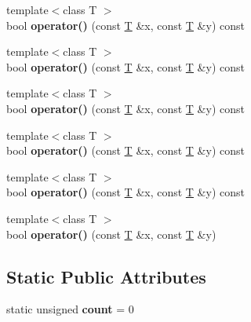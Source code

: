 \begin{DoxyCompactItemize}
{\footnotesize template$<$class T $>$ }\\bool {\bfseries operator()} (const \mbox{\hyperlink{struct_t}{T}} \&x, const \mbox{\hyperlink{struct_t}{T}} \&y) const
\item 
\mbox{\label{structcount__equal_af3e22fbfee92a5e2854cd3fee9dbf7ef}} 
{\footnotesize template$<$class T $>$ }\\bool {\bfseries operator()} (const \mbox{\hyperlink{struct_t}{T}} \&x, const \mbox{\hyperlink{struct_t}{T}} \&y) const
\item 
\mbox{\label{structcount__equal_af3e22fbfee92a5e2854cd3fee9dbf7ef}} 
{\footnotesize template$<$class T $>$ }\\bool {\bfseries operator()} (const \mbox{\hyperlink{struct_t}{T}} \&x, const \mbox{\hyperlink{struct_t}{T}} \&y) const
\item 
\mbox{\label{structcount__equal_af3e22fbfee92a5e2854cd3fee9dbf7ef}} 
{\footnotesize template$<$class T $>$ }\\bool {\bfseries operator()} (const \mbox{\hyperlink{struct_t}{T}} \&x, const \mbox{\hyperlink{struct_t}{T}} \&y) const
\item 
\mbox{\label{structcount__equal_af3e22fbfee92a5e2854cd3fee9dbf7ef}} 
{\footnotesize template$<$class T $>$ }\\bool {\bfseries operator()} (const \mbox{\hyperlink{struct_t}{T}} \&x, const \mbox{\hyperlink{struct_t}{T}} \&y) const
\item 
\mbox{\label{structcount__equal_a292cd821e08349355a9edbfa6c2f5554}} 
{\footnotesize template$<$class T $>$ }\\bool {\bfseries operator()} (const \mbox{\hyperlink{struct_t}{T}} \&x, const \mbox{\hyperlink{struct_t}{T}} \&y)
\end{DoxyCompactItemize}
\subsection*{Static Public Attributes}
\begin{DoxyCompactItemize}
\item 
\mbox{\label{structcount__equal_a06ad918e1c89ed2777e79ee77ea39cbc}} 
static unsigned {\bfseries count} = 0
\end{DoxyCompactItemize}


